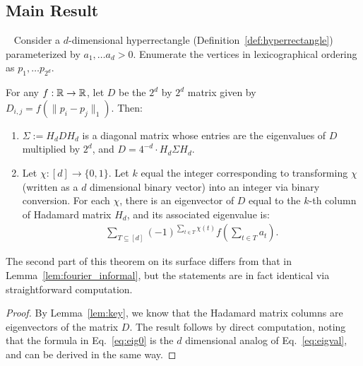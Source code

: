 \subsection{Main Result}
\begin{lemma}~\label{lem:fourier_formal}
Consider a $d$-dimensional hyperrectangle (Definition~\ref{def:hyperrectangle}) parameterized by $a_1, \ldots a_d > 0$. Enumerate the vertices in lexicographical ordering as $p_1, \ldots p_{2^d}$.
 
For any $f: {\mathbb R} \to {\mathbb R}$, let $D$ be the $2^d$ by $2^d$ matrix given by $D_{i,j} =f(\| p_i - p_j \|_1)$. Then:
 \begin{enumerate}
     \item $\Sigma := H_d D H_d$ is a diagonal matrix whose entries are the eigenvalues of $D$ multiplied by $2^d$, and $D = 4^{-d} \cdot H_d \Sigma H_d $.
     \item Let $\chi: [d] \rightarrow \{0, 1\}$. Let $k$ equal the integer corresponding to transforming $\chi$ (written as a $d$ dimensional binary vector) into an integer via binary conversion. For each $\chi$, there is an eigenvector of $D$ equal to the $k$-th column of Hadamard matrix $H_d$, and its associated eigenvalue is:
     \begin{align}\label{eq:eig0}
\sum_{T \subseteq [d]} (-1)^{\sum_{t \in T} \chi(t)} f\left(\sum_{t\in T}a_t\right).
\end{align}
\end{enumerate}
\end{lemma}

The second part of this theorem on its surface differs from that in Lemma~\ref{lem:fourier_informal}, but the statements are in fact identical via straightforward computation.
\begin{proof} By Lemma~\ref{lem:key}, we know that the Hadamard matrix columns are eigenvectors of the matrix $D$. The result follows by direct computation, noting that the formula in Eq.~\eqref{eq:eig0} is the $d$ dimensional analog of
Eq.~\eqref{eq:eigval}, and can be derived in the same way. \end{proof}

